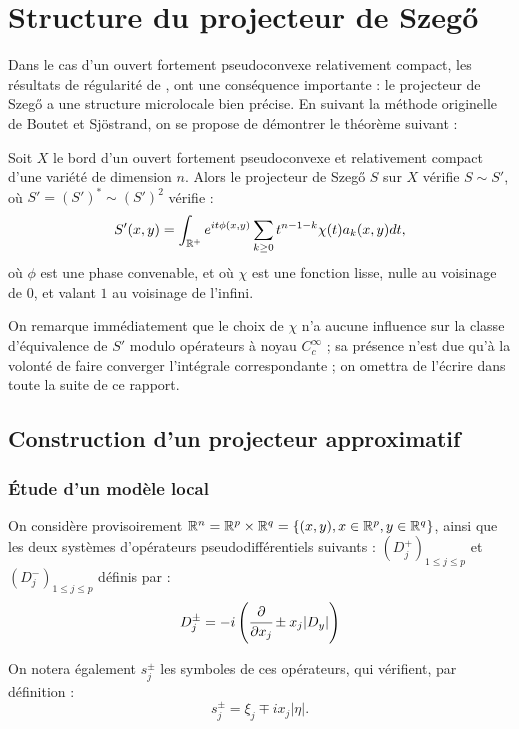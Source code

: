 \section{Structure du projecteur de Szeg\H{o}}

Dans le cas d'un ouvert fortement pseudoconvexe relativement compact, les résultats de régularité de \cite{kohn1963harmonic}, \cite{kohn1964harmonic} ont une conséquence importante : le projecteur de Szeg\H{o} a une structure microlocale bien précise. En suivant la méthode originelle de Boutet et Sjöstrand, on se propose de démontrer le théorème suivant :

\begin{theorem}
  Soit $X$ le bord d'un ouvert fortement pseudoconvexe et relativement compact d'une variété de dimension $n$. Alors le projecteur de Szeg\H{o} $S$ sur $X$ vérifie $S\sim S'$, où $S' = (S')^* \sim (S')^2$ vérifie :
  \begin{equation*}
    S'(x,y) = \int_{\mathbb{R}^+} e^{it\phi(x,y)}\sum_{k \geq 0}t^{n-1-k}\chi(t)a_k(x,y)dt,
  \end{equation*}
  \noindent où $\phi$ est une phase convenable, et où $\chi$ est une fonction lisse, nulle au voisinage de $0$, et valant $1$ au voisinage de l'infini.
\end{theorem}

On remarque immédiatement que le choix de $\chi$ n'a aucune influence sur la classe d'équivalence de $S'$ modulo opérateurs à noyau $C^{\infty}_c$ ; sa présence n'est due qu'à la volonté de faire converger l'intégrale correspondante ; on omettra de l'écrire dans toute la suite de ce rapport.
\subsection{Construction d'un projecteur approximatif}

\subsubsection{Étude d'un modèle local}
On considère provisoirement $\mathbb{R}^n = \mathbb{R}^p \times \mathbb{R}^q = \{(x,y), x \in \mathbb{R}^p, y \in \mathbb{R}^q\}$, ainsi que les deux systèmes d'opérateurs pseudodifférentiels suivants : $(D^+_j)_{1 \leq j \leq p}$ et $(D^-_j)_{1 \leq j \leq p}$ définis par :
\begin{equation*}
  D^{\pm}_j = -i\left(\cfrac{\partial}{\partial x_j} \pm x_j |D_y|\right)
\end{equation*}

\noindent On notera également $s_j^{\pm}$ les symboles de ces opérateurs, qui vérifient, par définition :
\begin{equation*}
  s^{\pm}_j = \xi_j \mp i x_j|\eta|.
\end{equation*}

